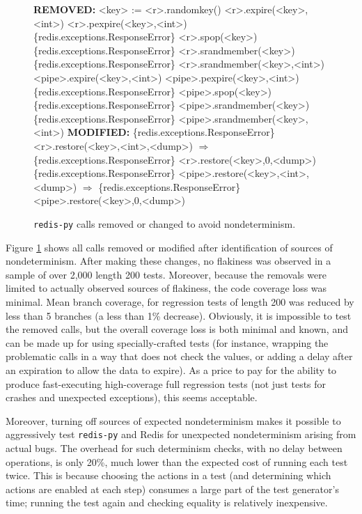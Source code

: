 \begin{figure}
\begin{code}
{\bf REMOVED:}    
<key> := <r>.randomkey() 
<r>.expire(<key>,<int>)
<r>.pexpire(<key>,<int>)
\{redis.exceptions.ResponseError\} <r>.spop(<key>)
\{redis.exceptions.ResponseError\} <r>.srandmember(<key>)
\{redis.exceptions.ResponseError\} <r>.srandmember(<key>,<int>)
<pipe>.expire(<key>,<int>)
<pipe>.pexpire(<key>,<int>)
\{redis.exceptions.ResponseError\} <pipe>.spop(<key>)
\{redis.exceptions.ResponseError\} <pipe>.srandmember(<key>)
\{redis.exceptions.ResponseError\} <pipe>.srandmember(<key>,<int>)
\vspace{0.1in}
{\bf MODIFIED:}
\{redis.exceptions.ResponseError\} <r>.restore(<key>,<int>,<dump>)
{\bf $\Rightarrow$}
\{redis.exceptions.ResponseError\} <r>.restore(<key>,0,<dump>)
\vspace{0.07in}
\{redis.exceptions.ResponseError\} <pipe>.restore(<key>,<int>,<dump>)
{\bf $\Rightarrow$}
\{redis.exceptions.ResponseError\} <pipe>.restore(<key>,0,<dump>)
\end{code}
\caption{{\tt redis-py} calls removed or changed to avoid
  nondeterminism.}
\label{fig:flakysource}
\end{figure}

Figure \ref{fig:flakysource} shows all calls removed or modified after
identification of sources of nondeterminism.  After making these changes, no flakiness was observed in a sample of over 2,000 length
200 tests.   Moreover, because the removals were limited to actually
observed sources of flakiness, the code coverage loss was minimal.
Mean branch coverage, for regression tests of length 200 was reduced
by less than 5 branches (a less than 1\% decrease).  Obviously, it is
impossible to test the removed calls, but the overall coverage loss is
both minimal and known, and can be made up for using specially-crafted
tests (for instance, wrapping the problematic calls in a way that does
not check the values, or adding a delay after an expiration to allow
the data to expire).  As a price to pay for the ability to produce
fast-executing high-coverage full regression tests (not just tests for
crashes and unexpected exceptions), this seems acceptable.

Moreover, turning off sources of expected nondeterminism makes
it possible to aggressively test {\tt redis-py} and Redis for
unexpected nondeterminism arising from actual bugs.  The overhead for such
determinism checks, with no delay between operations, is only
20\%, much lower than the expected cost of running each test twice.
This is because choosing the actions in a test (and determining which
actions are enabled at each step) consumes a large part of the test
generator's time; running the test again and checking equality is
relatively inexpensive.  

